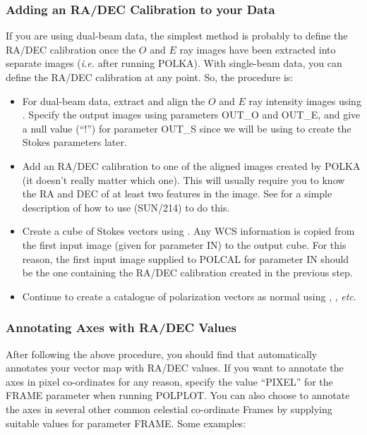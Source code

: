 \documentclass[twoside,11pt]{starlink}
\begin{document}
\subsubsection {Adding an RA/DEC Calibration to your Data}
If you are using dual-beam data, the simplest method is probably to define the
RA/DEC calibration once the $O$ and $E$ ray images have been extracted into
separate images (\emph{i.e.} after running POLKA). With single-beam data,
you can define the RA/DEC calibration at any point. So, the procedure is:

\begin{itemize}

\item For dual-beam data, extract and align the $O$ and $E$ ray intensity
images using . Specify the output images using
parameters OUT\_O and OUT\_E, and give a null value (``!'') for parameter
OUT\_S since we will be using  to create the Stokes
parameters later.

\item Add an RA/DEC calibration to one of the aligned images
created by POLKA (it doesn't really matter which one). This will usually
require you to know the RA and DEC of at least two features in the image.
See  for a simple description of how
to use  (SUN/214) to do this.

\item Create a cube of Stokes vectors using . Any
WCS information is copied from the first input image (given for parameter IN)
to the output cube. For this reason, the first input image supplied to
POLCAL for parameter IN should be the one containing the RA/DEC calibration
created in the previous step.

\item Continue to create a catalogue of polarization vectors as normal using
, , \emph{etc}.

\end{itemize}

\subsubsection {Annotating Axes with RA/DEC Values}
After following the above procedure, you should find that
 automatically annotates your vector map with
RA/DEC values. If you want to annotate the axes in pixel co-ordinates for
any reason, specify the value ``PIXEL'' for the FRAME parameter when running
POLPLOT. You can also choose to annotate the axes in several other common
celestial co-ordinate Frames by supplying suitable values for parameter
FRAME. Some examples:
\end{document}
